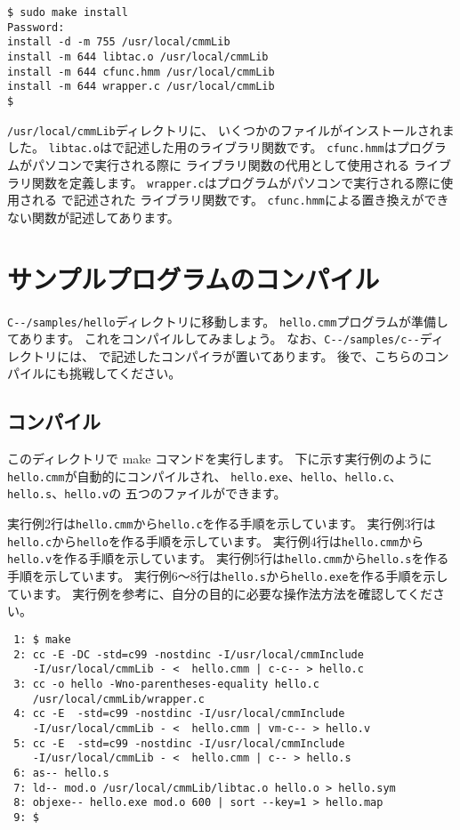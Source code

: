 \begin{mylist}
\begin{verbatim}
$ sudo make install
Password:
install -d -m 755 /usr/local/cmmLib
install -m 644 libtac.o /usr/local/cmmLib
install -m 644 cfunc.hmm /usr/local/cmmLib
install -m 644 wrapper.c /usr/local/cmmLib
$
\end{verbatim}
\end{mylist}

\verb;/usr/local/cmmLib;ディレクトリに、
いくつかのファイルがインストールされました。
\verb;libtac.o;は\cmml で記述した\tacos 用のライブラリ関数です。
\verb;cfunc.hmm;は\cmm プログラムがパソコンで実行される際に
\cmml ライブラリ関数の代用として使用される \cl ライブラリ関数を定義します。
\verb;wrapper.c;は\cmm プログラムがパソコンで実行される際に使用される
\cl で記述された \cmm ライブラリ関数です。
\verb;cfunc.hmm;による置き換えができない関数が記述してあります。

\section{サンプルプログラムのコンパイル}

\verb;C--/samples/hello;ディレクトリに移動します。
{\tt hello.cmm}プログラムが準備してあります。
これをコンパイルしてみましょう。
なお、\verb;C--/samples/c--;ディレクトリには、
\cmml で記述した\cmm コンパイラが置いてあります。
後で、こちらのコンパイルにも挑戦してください。

\subsection{コンパイル}

このディレクトリで make コマンドを実行します。
下に示す実行例のように{\tt hello.cmm}が自動的にコンパイルされ、
{\tt hello.exe}、{\tt hello}、{\tt hello.c}、{\tt hello.s}、{\tt hello.v}の
五つのファイルができます。

実行例2行は{\tt hello.cmm}から{\tt hello.c}を作る手順を示しています。
実行例3行は{\tt hello.c}から{\tt hello}を作る手順を示しています。
実行例4行は{\tt hello.cmm}から{\tt hello.v}を作る手順を示しています。
実行例5行は{\tt hello.cmm}から{\tt hello.s}を作る手順を示しています。
実行例6〜8行は{\tt hello.s}から{\tt hello.exe}を作る手順を示しています。
実行例を参考に、自分の目的に必要な操作法方法を確認してください。

\begin{mylist}
\begin{verbatim}
 1: $ make
 2: cc -E -DC -std=c99 -nostdinc -I/usr/local/cmmInclude
    -I/usr/local/cmmLib - <  hello.cmm | c-c-- > hello.c
 3: cc -o hello -Wno-parentheses-equality hello.c
    /usr/local/cmmLib/wrapper.c
 4: cc -E  -std=c99 -nostdinc -I/usr/local/cmmInclude
    -I/usr/local/cmmLib - <  hello.cmm | vm-c-- > hello.v
 5: cc -E  -std=c99 -nostdinc -I/usr/local/cmmInclude
    -I/usr/local/cmmLib - <  hello.cmm | c-- > hello.s
 6: as-- hello.s
 7: ld-- mod.o /usr/local/cmmLib/libtac.o hello.o > hello.sym
 8: objexe-- hello.exe mod.o 600 | sort --key=1 > hello.map
 9: $
\end{verbatim}
\end{mylist}

